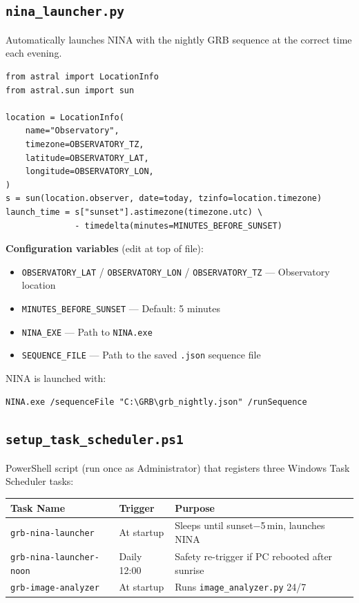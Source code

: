 \documentclass[12pt,a4paper]{article}
\begin{document}
\subsection{\texttt{nina\_launcher.py}}

Automatically launches NINA with the nightly GRB sequence at the correct
time each evening.

\begin{lstlisting}[style=python, caption={Sunset calculation with astral}]
from astral import LocationInfo
from astral.sun import sun

location = LocationInfo(
    name="Observatory",
    timezone=OBSERVATORY_TZ,
    latitude=OBSERVATORY_LAT,
    longitude=OBSERVATORY_LON,
)
s = sun(location.observer, date=today, tzinfo=location.timezone)
launch_time = s["sunset"].astimezone(timezone.utc) \
              - timedelta(minutes=MINUTES_BEFORE_SUNSET)
\end{lstlisting}

\textbf{Configuration variables} (edit at top of file):

\begin{itemize}
    \item \texttt{OBSERVATORY\_LAT} / \texttt{OBSERVATORY\_LON} /
          \texttt{OBSERVATORY\_TZ} --- Observatory location
    \item \texttt{MINUTES\_BEFORE\_SUNSET} --- Default: 5 minutes
    \item \texttt{NINA\_EXE} --- Path to \texttt{NINA.exe}
    \item \texttt{SEQUENCE\_FILE} --- Path to the saved
          \texttt{.json} sequence file
\end{itemize}

NINA is launched with:
\begin{lstlisting}[style=bash]
NINA.exe /sequenceFile "C:\GRB\grb_nightly.json" /runSequence
\end{lstlisting}

\subsection{\texttt{setup\_task\_scheduler.ps1}}

PowerShell script (run once as Administrator) that registers three Windows
Task Scheduler tasks:

\begin{center}
\begin{tabular}{lll}
\toprule
Task Name & Trigger & Purpose \\
\midrule
\texttt{grb-nina-launcher} & At startup & Sleeps until sunset$-$5\,min, launches NINA \\
\texttt{grb-nina-launcher-noon} & Daily 12:00 & Safety re-trigger if PC rebooted after sunrise \\
\texttt{grb-image-analyzer} & At startup & Runs \texttt{image\_analyzer.py} 24/7 \\
\bottomrule
\end{tabular}
\end{center}
\end{document}

